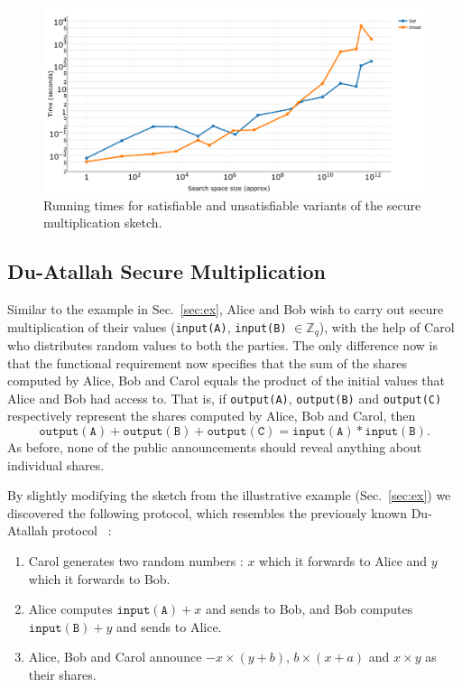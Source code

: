 \documentclass[preprint]{sig-alternate-05-2015}
\begin{document}
\begin{figure}
\centering
\includegraphics[width=\columnwidth]{plot-sec-mult-no-labels.png}
\caption{Running times for satisfiable and unsatisfiable variants of 
the secure multiplication sketch.}
\label{fig:plot-sec-mult}
\end{figure}


\subsection{Du-Atallah Secure Multiplication}

Similar to the example in Sec.~\ref{sec:ex}, 
Alice and Bob wish to carry out secure multiplication of 
their values (\texttt{input(A)}, \texttt{input(B)} $\in \mathbb{Z}_q$),
with the help of Carol who distributes random values to both the parties.
The only difference now is that the functional requirement now specifies
that the sum of the shares computed by Alice, Bob 
and Carol equals the product of the initial values 
that Alice and Bob had access to.
That is, if \texttt{output(A)}, \texttt{output(B)} and \texttt{output(C)}
respectively represent the shares computed by Alice, Bob and Carol, then
$$
\mathtt{output(A)} + \mathtt{output(B)} + \mathtt{output(C)} = \mathtt{input(A)}*\mathtt{input(B)}.
$$
As before, none of the public announcements should reveal anything
about individual shares.

By slightly modifying the sketch from the illustrative example 
(Sec.~\ref{sec:ex}) we discovered the following 
protocol, which resembles the previously known Du-Atallah protocol~\cite{DA01} :
\begin{enumerate}\itemsep=0em
    \item Carol generates two random numbers : $x$ which it forwards to Alice
        and $y$ which it forwards to Bob.
    \item Alice computes $\mathtt{input(A)} + x$ and sends to Bob,
        and Bob computes $\mathtt{input(B)} + y$ and sends to Alice.
    \item Alice, Bob and Carol announce $-x\times(y+b)$, $b\times(x+a)$ and 
        $x\times y$ as their shares.
\end{enumerate}
\end{document}

